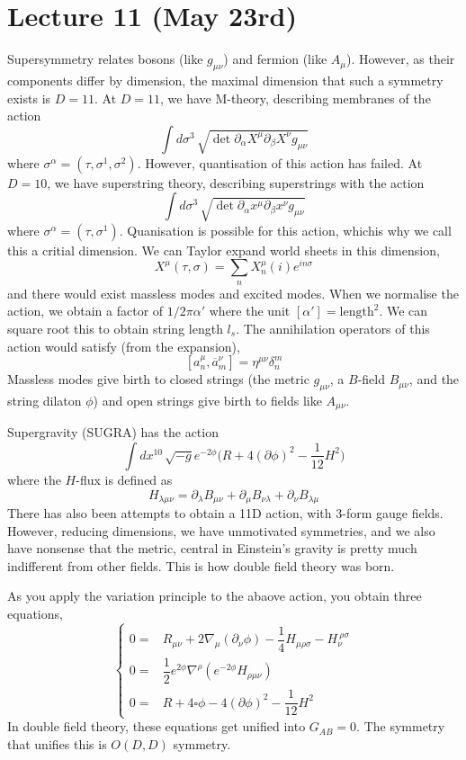 \section{Lecture 11 (May 23rd)}
\begin{rmk}
Supersymmetry relates bosons (like $g_{\mu \nu }$) and fermion (like $A_{\mu }$). However, as their components differ by dimension, the maximal dimension that such a symmetry exists is $D=11$. At $D=11$, we have M-theory, describing membranes of the action
\[\int d\sigma ^{3}\,\sqrt{\mathop{\mathrm{det}}\partial _{\alpha }X^{\mu }\partial _{\beta }X^{\nu }g_{\mu \nu }}\]
where $\sigma^{\alpha }=(\tau ,\sigma ^{1},\sigma ^{2})$. However, quantisation of this action has failed. At $D=10$, we have superstring theory, describing superstrings with the action
\[\int d\sigma ^3\,\sqrt{\mathop{\mathrm{det}}\partial _{\alpha }x^{\mu }\partial _{\beta }x^{\nu }g_{\mu \nu }}\]
where $\sigma ^{\alpha }=(\tau,\sigma ^{1})$. Quanisation is possible for this action, whichis why we call this a critial dimension. We can Taylor expand world sheets in this dimension,
\[X^{\mu }(\tau ,\sigma )=\sum _{n}X^{\mu }_{n}(i)e^{in\sigma }\] 
and there would exist massless modes and excited modes. When we normalise the action, we obtain a factor of $1/2\pi \alpha '$ where the unit $[\alpha ']=\mathrm{length}^2$. We can square root this to obtain string length $l_{s}$. The annihilation operators of this action would satisfy (from the expansion), 
\[[a_{n}^{\mu },\overline{a}_{m}^{\nu }]=\eta ^{\mu \nu }\delta ^{m}_{n}\]
Massless modes give birth to closed strings (the metric $g_{\mu \nu }$, a $B$-field $B_{\mu \nu }$, and the string dilaton $\phi $) and open strings give birth to fields like $A_{\mu \nu }$.
\end{rmk}
\vspace{2ex}
\begin{defi}
Supergravity (SUGRA) has the action
\[\int dx^{10}\,\sqrt{-g}e^{-2\phi }\Big(R+4(\partial \phi )^2-\dfrac{1}{12}H^2\Big)\]
where the $H$-flux is defined as
\[H_{\lambda \mu \nu }=\partial _{\lambda }B_{\mu \nu }+\partial _{\mu }B_{\nu \lambda }+\partial _{\nu }B_{\lambda \mu }\]
There has also been attempts to obtain a 11D action, with 3-form gauge fields. However, reducing dimensions, we have unmotivated symmetries, and we also have nonsense that the metric, central in Einstein's gravity is pretty much indifferent from other fields. This is how double field theory was born.
\end{defi}
\vspace{2ex}
\begin{prop}
As you apply the variation principle to the abaove action, you obtain three equations,
\[\begin{cases}
0=&R_{\mu \nu }+2\nabla _{\mu }(\partial _{\nu }\phi )-\dfrac{1}{4}H_{\mu\rho \sigma  }-H_{\nu }^{\ \rho \sigma }\\
0=&\dfrac{1}{2}e^{2\phi }\nabla ^{\rho }(e^{-2\phi }H_{\rho \mu \nu })\\
0=&R+4\square \phi -4(\partial\phi )^2-\dfrac{1}{12}H^2
\end{cases}\]
In double field theory, these equations get unified into $G_{AB}=0$. The symmetry that unifies this is $O(D,D)$ symmetry.
\end{prop}
